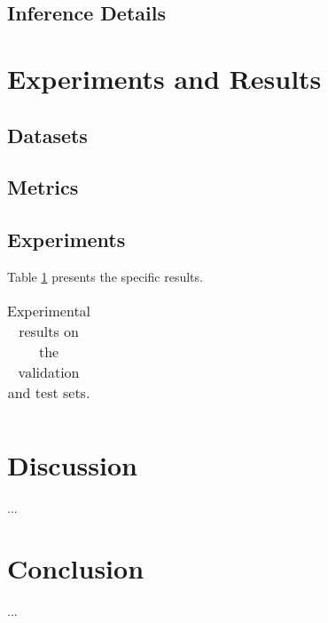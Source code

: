 \documentclass[runningheads]{llncs}
\begin{document}
\subsection{Inference Details}


\section{Experiments and Results}
\subsection{Datasets}

\subsection{Metrics}


\subsection{Experiments}
Table \ref{tab1} presents the specific results.


\begin{table}[htbp]
  \renewcommand{\arraystretch}{1.25}
  \centering
  \caption{Experimental results on the validation and test sets.}
    \begin{tabular}{}

    \end{tabular}%
  \label{tab1}%
\end{table}%


\section{Discussion}
...


\section{Conclusion}
...



%
\end{document}
